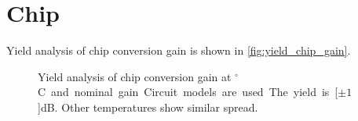 	\section{Chip}
		Yield analysis of chip conversion gain is shown in \autoref{fig:yield_chip_gain}.

			\begin{figure}[hbt!]
				\centering
				\caption[Spread on chip conversion gain.]{Yield analysis of chip conversion gain at \unit[55]{$^\circ$C} and nominal gain. Circuit models are used. The yield is \unit[$\pm1$]{dB}. Other temperatures show similar spread.}\label{fig:yield_chip_gain}
			\end{figure}

